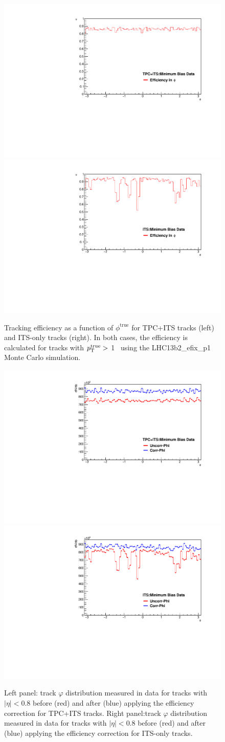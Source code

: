 \begin{figure}[h]
\center
\includegraphics[width=.495\textwidth]{Tracking/tpc_phi_eff.pdf}
\includegraphics[width=.495\textwidth]{Tracking/its_phi_eff.pdf}
\caption{Tracking efficiency as a function of $\phi^{\mathrm{true}}$ for TPC+ITS tracks (left) and ITS-only tracks (right). In both cases, the efficiency is calculated for tracks with $p_{\mathrm{T}}^{\mathrm{true}}>$ 1 \GeVc~using the LHC13b2\_efix\_p1 Monte Carlo simulation.}
\label{fig:phiEff}
\end{figure}

\begin{figure}[h]
\center
\includegraphics[width=.495\textwidth]{Tracking/phi_efficiency_cor_tpc.pdf}
\includegraphics[width=.495\textwidth]{Tracking/phi_efficiency_cor_its.pdf}
\caption{Left panel: track $\varphi$ distribution measured in data for tracks with $|\eta|<0.8$ before (red) and after (blue) applying the efficiency correction for TPC+ITS tracks. Right panel:track $\varphi$ distribution measured in data for tracks with $|\eta|<0.8$ before (red) and after (blue) applying the efficiency correction for ITS-only tracks.}
\label{fig:phiCorr}
\end{figure}

